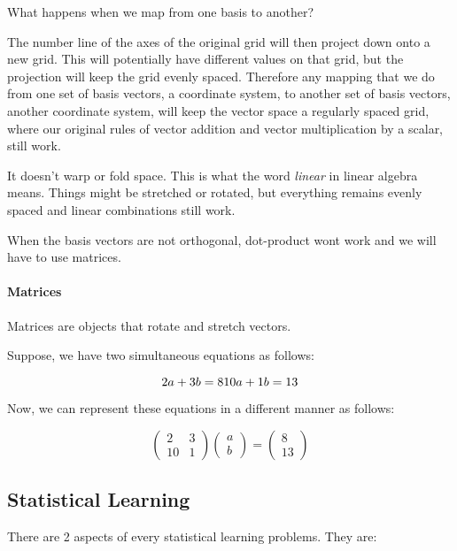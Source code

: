 \documentclass[11pt]{article}
\begin{document}
What happens when we map from one basis to another?

The number line of the axes of the original grid will then project down
onto a new grid. This will potentially have different values on that
grid, but the projection will keep the grid evenly spaced. Therefore any
mapping that we do from one set of basis vectors, a coordinate system,
to another set of basis vectors, another coordinate system, will keep
the vector space a regularly spaced grid, where our original rules of
vector addition and vector multiplication by a scalar, still work.

It doesn't warp or fold space. This is what the word \emph{linear} in
linear algebra means. Things might be stretched or rotated, but
everything remains evenly spaced and linear combinations still work.

When the basis vectors are not orthogonal, dot-product wont work and we
will have to use matrices.

\hypertarget{matrices}{%
\paragraph{Matrices}\label{matrices}}

Matrices are objects that rotate and stretch vectors.

Suppose, we have two simultaneous equations as follows:

\[
2a + 3b = 8 \\
10a + 1b = 13
\]

Now, we can represent these equations in a different manner as follows:

\[
\begin{pmatrix}
    2 & 3 \\
    10 & 1
\end{pmatrix}
\begin{pmatrix}
    a \\
    b
\end{pmatrix}
=
\begin{pmatrix}
    8 \\
    13
\end{pmatrix}
\]

    \hypertarget{statistical-learning}{%
\subsection{Statistical Learning}\label{statistical-learning}}

    There are 2 aspects of every statistical learning problems. They are:
\end{document}
